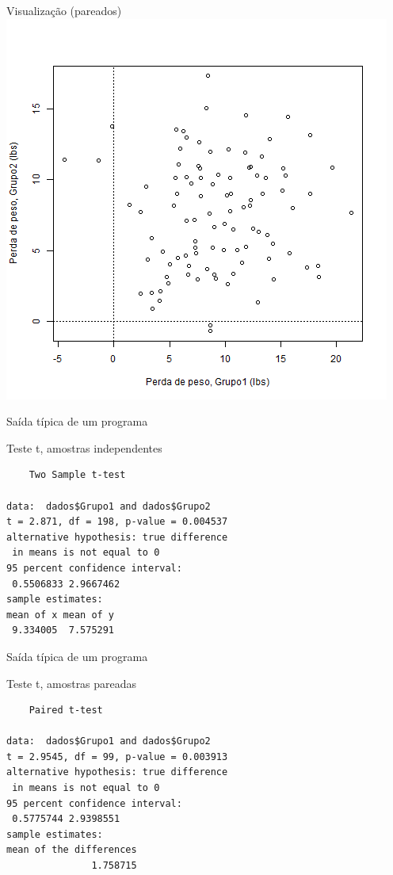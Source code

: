 \documentclass{beamer}
\begin{document}
\begin{frame}{Visualização (pareados)}
    \includegraphics[height=\textheight]{Teste_t/2-amostras-pareadas}
  \end{frame}


\begin{frame}[fragile]{Saída típica de um programa}
  \begin{block}{Teste t, amostras independentes}
    \begin{verbatim}
	Two Sample t-test

data:  dados$Grupo1 and dados$Grupo2
t = 2.871, df = 198, p-value = 0.004537
alternative hypothesis: true difference 
 in means is not equal to 0
95 percent confidence interval:
 0.5506833 2.9667462
sample estimates:
mean of x mean of y 
 9.334005  7.575291
    \end{verbatim}
  \end{block}
\end{frame}

\begin{frame}[fragile]{Saída típica de um programa}
  \begin{block}{Teste t, amostras pareadas}
    \begin{verbatim}
	Paired t-test

data:  dados$Grupo1 and dados$Grupo2
t = 2.9545, df = 99, p-value = 0.003913
alternative hypothesis: true difference 
 in means is not equal to 0
95 percent confidence interval:
 0.5775744 2.9398551
sample estimates:
mean of the differences 
               1.758715
    \end{verbatim}
  \end{block}
\end{frame}
\end{document}
